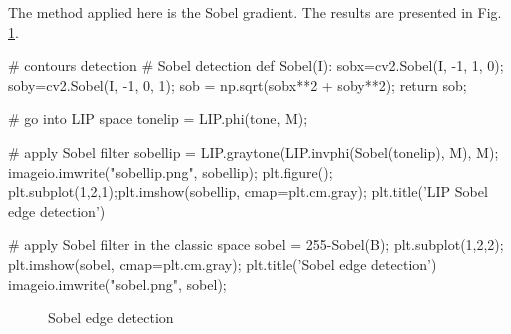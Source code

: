 The method applied here is the Sobel gradient. The results are presented in Fig. \ref{lippython:fig:sobel}.

\begin{python}
# contours detection
# Sobel detection
def Sobel(I):
    sobx=cv2.Sobel(I, -1, 1, 0);
    soby=cv2.Sobel(I, -1, 0, 1);
    sob = np.sqrt(sobx**2 + soby**2);
    return sob;

# go into LIP space
tonelip = LIP.phi(tone, M);

# apply Sobel filter
sobellip = LIP.graytone(LIP.invphi(Sobel(tonelip), M), M);
imageio.imwrite("sobellip.png", sobellip);
plt.figure();
plt.subplot(1,2,1);plt.imshow(sobellip, cmap=plt.cm.gray); 
plt.title('LIP Sobel edge detection')

# apply Sobel filter in the classic space
sobel = 255-Sobel(B);
plt.subplot(1,2,2); plt.imshow(sobel, cmap=plt.cm.gray); 
plt.title('Sobel edge detection')
imageio.imwrite("sobel.png", sobel);
\end{python}

\begin{figure}[htbp]
\centering\caption{Sobel edge detection}%
\hspace{1cm}
%
\vspace*{-3mm}%
\label{lippython:fig:sobel}%
\end{figure}

